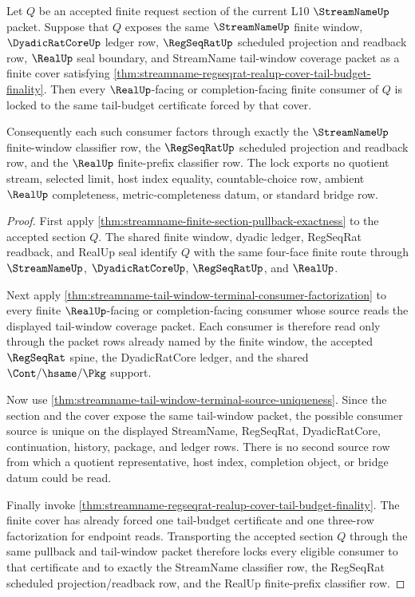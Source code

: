 \begin{theorem}
\label{thm:streamname-finite-section-tail-window-lock}
Let $Q$ be an accepted finite request section of the current L10
$\StreamNameUp$ packet. Suppose that $Q$ exposes the same $\StreamNameUp$
finite window, $\DyadicRatCoreUp$ ledger row, $\RegSeqRatUp$ scheduled
projection and readback row, $\RealUp$ seal boundary, and StreamName
tail-window coverage packet as a finite cover satisfying
\autoref{thm:streamname-regseqrat-realup-cover-tail-budget-finality}. Then
every $\RealUp$-facing or completion-facing finite consumer of $Q$ is locked to
the same tail-budget certificate forced by that cover.

Consequently each such consumer factors through exactly the $\StreamNameUp$
finite-window classifier row, the $\RegSeqRatUp$ scheduled projection and
readback row, and the $\RealUp$ finite-prefix classifier row. The lock exports
no quotient stream, selected limit, host index equality, countable-choice row,
ambient $\RealUp$ completeness, metric-completeness datum, or standard bridge
row.
\end{theorem}
\begin{proof}
First apply \autoref{thm:streamname-finite-section-pullback-exactness} to the
accepted section $Q$. The shared finite window, dyadic ledger, RegSeqRat
readback, and RealUp seal identify $Q$ with the same four-face finite route
through $\StreamNameUp$, $\DyadicRatCoreUp$, $\RegSeqRatUp$, and $\RealUp$.

Next apply
\autoref{thm:streamname-tail-window-terminal-consumer-factorization} to every
finite $\RealUp$-facing or completion-facing consumer whose source reads the
displayed tail-window coverage packet. Each consumer is therefore read only
through the packet rows already named by the finite window, the accepted
$\RegSeqRat$ spine, the DyadicRatCore ledger, and the shared
$\Cont/\hsame/\Pkg$ support.

Now use \autoref{thm:streamname-tail-window-terminal-source-uniqueness}. Since
the section and the cover expose the same tail-window packet, the possible
consumer source is unique on the displayed StreamName, RegSeqRat, DyadicRatCore,
continuation, history, package, and ledger rows. There is no second source row
from which a quotient representative, host index, completion object, or bridge
datum could be read.

Finally invoke
\autoref{thm:streamname-regseqrat-realup-cover-tail-budget-finality}. The finite
cover has already forced one tail-budget certificate and one three-row
factorization for endpoint reads. Transporting the accepted section $Q$ through
the same pullback and tail-window packet therefore locks every eligible consumer
to that certificate and to exactly the StreamName classifier row, the RegSeqRat
scheduled projection/readback row, and the RealUp finite-prefix classifier row.
\end{proof}
